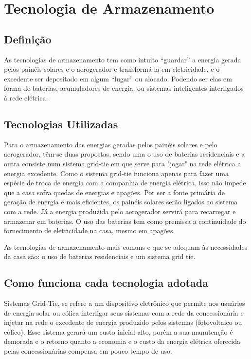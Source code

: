 
\section{Tecnologia de Armazenamento}

\subsection{Definição}

	As tecnologias de armazenamento tem como intuito “guardar” a energia gerada pelos painéis solares e o aerogerador e transformá-la em eletricidade, e o excedente ser depositado em algum “lugar” ou alocado. Podendo ser elas em forma de baterias, acumuladores de energia, ou sistemas inteligentes interligados à rede elétrica. 

\subsection{Tecnologias Utilizadas}
	
	Para o armazenamento das energias geradas pelos painéis solares e pelo aerogerador, têm-se duas propostas, sendo uma o uso de baterias residenciais e a outra consiste num sistema grid-tie em que serve para "jogar" na rede elétrica a energia excedente. Como o sistema grid-tie funciona apenas para fazer uma espécie de troca de energia com a companhia de energia elétrica, isso não impede que a casa sofra quedas de energias e apagões. Por ser a fonte primária de geração de energia e mais eficientes, os painéis solares serão ligados ao sistema com a rede. Já a energia produzida pelo aerogerador servirá para recarregar e armazenar em baterias. O uso das baterias tem como premissa a continuidade do fornecimento de eletricidade na casa, mesmo em apagões. 

	As tecnologias de armazenamento mais comuns e que se adequam às necessidades da casa são: o uso de baterias residenciais e um sistema grid tie.

\subsection{Como funciona cada tecnologia adotada}

	Sistemas Grid-Tie, se refere a um dispositivo eletrônico que permite aos usuários de energia solar ou eólica interligar seus sistemas com a rede da concessionária e injetar na rede o excedente de energia produzido pelos sistemas (fotovoltaico ou eólico). Esse sistema gerará um custo inicial alto, porém a sua manutenção é demorada e o retorno quanto a economia e o custo da energia elétrica oferecida pelas concessionárias compensa em pouco tempo de uso. 

